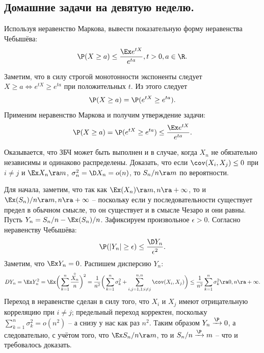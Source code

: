 \subsection{Домашние задачи на девятую неделю.}
\begin{problem}
    Используя неравенство Маркова, вывести показательную форму неравенства Чебышёва:
    \[
        \P(X \geq a) \leq \dfrac{\Ex e^{tX}}{e^{ta}}, t > 0, a \in \R.
    \]
\end{problem}
\begin{solution}
    Заметим, что в силу строгой монотонности экспоненты следует $X \geq a \Longleftrightarrow e^{tX} \geq e^{ta}$ при положительных $t$.
    Из этого следует
    \[
        \P(X \geq a) = \P(e^{tX} \geq e^{ta}).
    \]
    Применим неравенство Маркова и получим утверждение задачи:
    \[
        \P(X \geq a) = \P(e^{tX} \geq e^{ta}) \leq \dfrac{\Ex e^{tX}}{e^{ta}}.
    \]
\end{solution}
\begin{problem}
    Оказывается, что ЗБЧ может быть выполнен и в случае, когда $X_n$ не обязательно независимы и одинаково распределены.
    Доказать, что если $\cov(X_i, X_j) \leq 0$ при $i \neq j$ и $\Ex X_n \ra m$, $\sigma^2_{n} = \D X_n = o(n)$, то $S_n/n \ra m$ по вероятности.
\end{problem}
\begin{solution}
    Для начала, заметим, что так как $\Ex(X_n) \ra m, n \ra +\infty$, то и $\Ex(S_n)/n \ra m, n \ra +\infty$ -- поскольку если у последовательности существует предел в обычном смысле, то он существует и в смысле Чезаро и они равны. \\
    Пусть $Y_n = S_n/n - \Ex(S_n)/n$.
    Зафиксируем произвольное $\epsilon > 0$.
    Согласно неравенству Чебышёва:
    \[
        \P(|Y_n| \geq \epsilon) \leq \dfrac{\D Y_n}{\epsilon^2}.
    \]
    Заметим, что $\Ex Y_n = 0$.
    Распишем дисперсию $Y_n$:
    \[
        DY_n = \Ex Y_n^2 = \Ex \biggr( \sum\limits_{k = 1}^n \dfrac{\overset{\circ}{X_n}}{n} \biggr)^2 = \dfrac{1}{n^2}\biggr(\sum\limits_{k = 1}^n \sigma_k^2 + \sum\limits_{i, j = 1, 1; i \neq j}^{n, n} \cov (X_i, X_j) \biggr) \leq \dfrac{1}{n^2}\sum\limits_{k = 1}^n \sigma^2_k \ra 0, n \ra +\infty.
    \]
    Переход в неравенстве сделан в силу того, что $X_i$ и $X_j$ имеют отрицательную корреляцию при $i \neq j$; предельный переход корректен, поскольку $\sum\limits_{k = 1}^n \sigma^2_k = o(n^2)$ -- а снизу у нас как раз $n^2$.
    Таким образом $Y_n \xrightarrow{\P} 0$, а следовательно, с учётом того, что $\Ex S_n/n \ra m$, то и $S_n/n \xrightarrow{\P} m$ -- что и требовалось доказать.
\end{solution}
